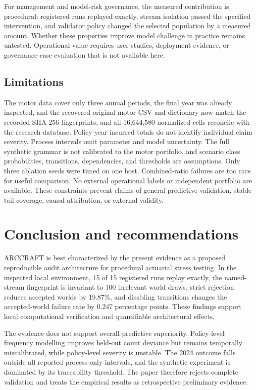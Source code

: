 For management and model-risk governance, the measured contribution is procedural: registered runs replayed exactly, stream isolation passed the specified intervention, and validator policy changed the selected population by a measured amount. Whether these properties improve model challenge in practice remains untested. Operational value requires user studies, deployment evidence, or governance-case evaluation that is not available here.

\subsection{Limitations}\label{sec:limitations}

The motor data cover only three annual periods, the final year was already inspected, and the recovered original motor CSV and dictionary now match the recorded SHA-256 fingerprints, and all 16,644,580 normalized cells reconcile with the research database. Policy-year incurred totals do not identify individual claim severity. Process intervals omit parameter and model uncertainty. The full synthetic grammar is not calibrated to the motor portfolio, and scenario class probabilities, transitions, dependencies, and thresholds are assumptions. Only three ablation seeds were timed on one host. Combined-ratio failures are too rare for useful comparison. No external operational labels or independent portfolio are available. These constraints prevent claims of general predictive validation, stable tail coverage, causal attribution, or external validity.

\section{Conclusion and recommendations}\label{sec:conclusion-and-recommendations}

ARCCRAFT is best characterized by the present evidence as a proposed reproducible audit architecture for procedural actuarial stress testing. In the inspected local environment, 15 of 15 registered runs replay exactly, the named-stream fingerprint is invariant to 100 irrelevant world draws, strict rejection reduces accepted worlds by 19.87\%, and disabling transitions changes the accepted-world failure rate by 0.247 percentage points. These findings support local computational verification and quantifiable architectural effects.

The evidence does not support overall predictive superiority. Policy-level frequency modelling improves held-out count deviance but remains temporally miscalibrated, while policy-level severity is unstable. The 2024 outcome falls outside all reported process-only intervals, and the synthetic experiment is dominated by its traceability threshold. The paper therefore rejects complete validation and treats the empirical results as retrospective preliminary evidence.

